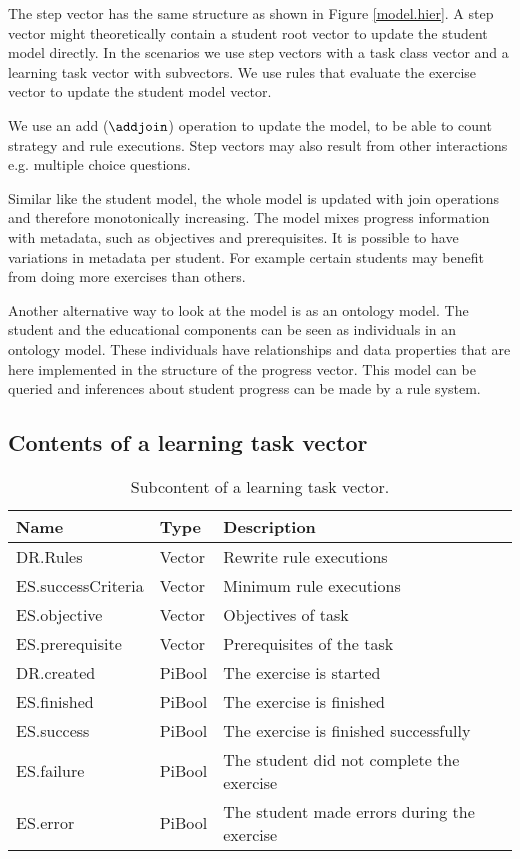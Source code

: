 The step vector has the same structure as shown in Figure \ref{model.hier}.
A step vector might theoretically contain a student root vector to update the student model directly. 
In the scenarios we use step vectors with a task class vector and a learning task vector with subvectors.
We use rules that evaluate the exercise vector to update the student model vector.

We use an add ($\addjoin$) operation to update the model, to be able to count strategy and rule executions.
Step vectors may also result from other interactions e.g. multiple choice questions.

Similar like the student model, the whole model is updated with join operations and therefore monotonically increasing.
The model mixes progress information with metadata, such as objectives and prerequisites.
It is possible to have variations in metadata per student.
For example certain students may benefit from doing more exercises than others.

Another alternative way to look at the model is as an ontology model.
The student and the educational components can be seen as individuals in an ontology model.
These individuals have relationships and data properties that are here implemented in the structure of the progress vector.
This model can be queried and inferences about student progress can be made by a rule system.

\subsection{Contents of a learning task vector}
\label{sec:rllearntask}



\begin{table}[H]
\begin{tabular}{| l | l | l |}
\hline
Name & Type& Description \\
\hline
DR.Rules & Vector & Rewrite rule executions\\
ES.successCriteria & Vector &  Minimum rule executions\\
ES.objective & Vector & Objectives of task\\
ES.prerequisite & Vector &  Prerequisites of the task\\
DR.created & PiBool & The exercise is started  \\
ES.finished & PiBool & The exercise is finished \\
ES.success & PiBool & The exercise is finished successfully\\
ES.failure &PiBool & The student did not complete the exercise \\
ES.error &PiBool &  The student made errors during the exercise\\
\hline
\end{tabular}
\caption{Subcontent of a learning task vector.}
\label{student.progressvec2}
\end{table}

